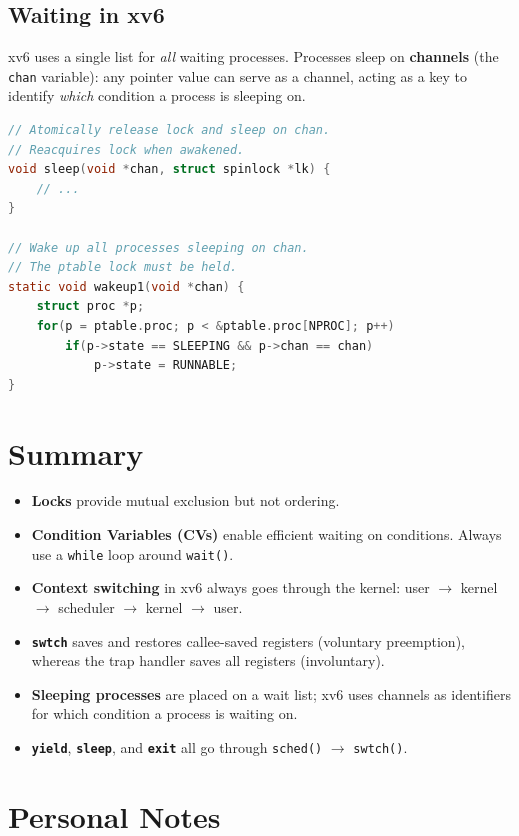 \documentclass[11pt]{article}
\begin{document}
\subsection{Waiting in xv6}

xv6 uses a single list for \emph{all} waiting processes. Processes sleep on \textbf{channels} (the \texttt{chan} variable): any pointer value can serve as a channel, acting as a key to identify \emph{which} condition a process is sleeping on.

\begin{lstlisting}[language=C, caption={sleep() and wakeup1() in proc.c}]
// Atomically release lock and sleep on chan.
// Reacquires lock when awakened.
void sleep(void *chan, struct spinlock *lk) {
    // ...
}

// Wake up all processes sleeping on chan.
// The ptable lock must be held.
static void wakeup1(void *chan) {
    struct proc *p;
    for(p = ptable.proc; p < &ptable.proc[NPROC]; p++)
        if(p->state == SLEEPING && p->chan == chan)
            p->state = RUNNABLE;
}
\end{lstlisting}

\section{Summary}

\begin{itemize}
    \item \textbf{Locks} provide mutual exclusion but not ordering.
    \item \textbf{Condition Variables (CVs)} enable efficient waiting on conditions. Always use a \texttt{while} loop around \texttt{wait()}.
    \item \textbf{Context switching} in xv6 always goes through the kernel: user $\to$ kernel $\to$ scheduler $\to$ kernel $\to$ user.
    \item \textbf{\texttt{swtch}} saves and restores callee-saved registers (voluntary preemption), whereas the trap handler saves all registers (involuntary).
    \item \textbf{Sleeping processes} are placed on a wait list; xv6 uses channels as identifiers for which condition a process is waiting on.
    \item \textbf{\texttt{yield}}, \textbf{\texttt{sleep}}, and \textbf{\texttt{exit}} all go through \texttt{sched()} $\to$ \texttt{swtch()}.
\end{itemize}

\section*{Personal Notes}
\end{document}
